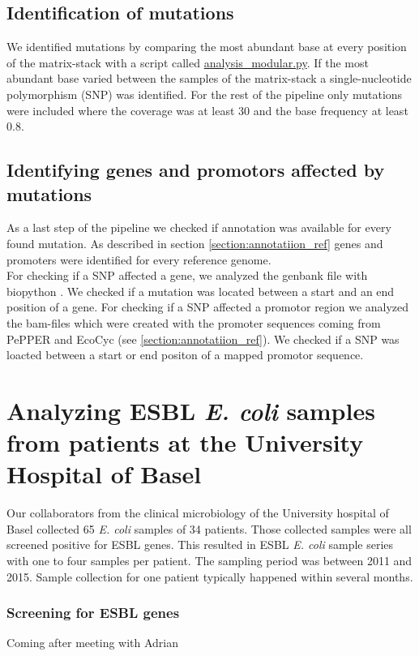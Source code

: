 \subsection{Identification of mutations} 
We identified mutations by comparing the most abundant base at every position of the matrix-stack with a script called \href{https://github.com/nahanoo/ESBL\_project/pileup.py}{analysis\_modular.py}. If the most abundant base varied between the samples of the matrix-stack a single-nucleotide polymorphism (SNP) was identified. For the rest of the pipeline only mutations were included where the coverage was at least 30 and the base frequency at least 0.8.

\subsection{Identifying genes and promotors affected by mutations}
As a last step of the pipeline we checked if annotation was available for every found mutation. As described in section \ref{section:annotatiion_ref} genes and promoters were identified for every reference genome. \\
For checking if a SNP affected a gene, we analyzed the genbank file with biopython \cite{cock_biopython:_2009}. We checked if a mutation was located between a start and an end position of a gene. For checking if a SNP affected a promotor region we analyzed the bam-files which were created with the promoter sequences coming from PePPER and EcoCyc (see \ref{section:annotatiion_ref}). We checked if a SNP was loacted between a start or end positon of a mapped promotor sequence. 

\section{Analyzing ESBL \textit{E. coli} samples from patients at the University Hospital of Basel}
Our collaborators from the clinical microbiology of the University hospital of Basel collected 65 \textit{E. coli} samples of 34 patients. Those collected samples were all screened positive for ESBL genes. This resulted in ESBL \textit{E. coli} sample series with one to four samples per patient. The sampling period was between 2011 and 2015. Sample collection for one patient typically happened within several months.
\label{section:sample_collection}
\subsubsection{Screening for ESBL genes}
Coming after meeting with Adrian
